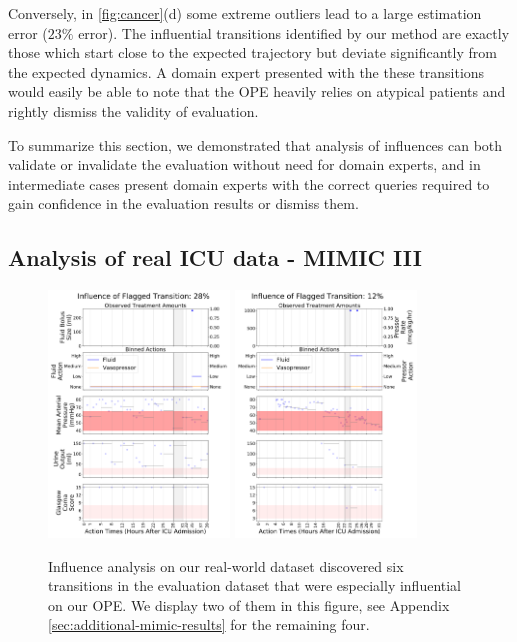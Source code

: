\documentclass{article}
\begin{document}
Conversely, in \ref{fig:cancer}(d) some extreme outliers lead to a large estimation error ($23\%$ error). The influential transitions identified by our method are exactly those which start close to the expected trajectory but deviate significantly from the expected dynamics. A domain expert presented with the these transitions would easily be able to note that the OPE heavily relies on atypical patients and rightly dismiss the validity of evaluation.

To summarize this section, we demonstrated that analysis of influences can both validate or invalidate the evaluation without need for domain experts, and in intermediate cases present domain experts with the correct queries required to gain confidence in the evaluation results or dismiss them.

\subsection{Analysis of real ICU data - MIMIC III}

\begin{figure}[t]
\centering
\includegraphics[width=0.43\textwidth]{ID-226662_trans-8.pdf}
\includegraphics[width=0.43\textwidth]{ID-233975_trans-10.pdf}
\caption{Influence analysis on our real-world dataset discovered six transitions in the evaluation dataset that were especially influential on our OPE. We display two of them in this figure, see Appendix \ref{sec:additional-mimic-results} for the remaining four.} 
\label{fig:mimic}
\end{figure}
\end{document}
